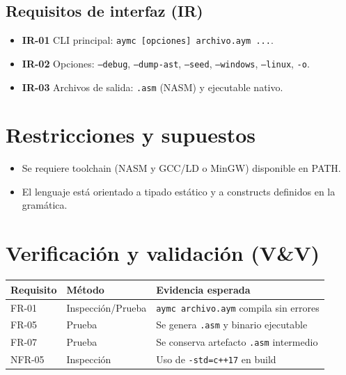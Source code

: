 \documentclass[11pt,a4paper]{article}
\begin{document}
\subsection{Requisitos de interfaz (IR)}
\begin{itemize}
    \item \textbf{IR-01} CLI principal: \texttt{aymc [opciones] archivo.aym ...}.
    \item \textbf{IR-02} Opciones: \texttt{--debug}, \texttt{--dump-ast}, \texttt{--seed}, \texttt{--windows}, \texttt{--linux}, \texttt{-o}.
    \item \textbf{IR-03} Archivos de salida: \texttt{.asm} (NASM) y ejecutable nativo.
\end{itemize}

\section{Restricciones y supuestos}
\begin{itemize}
    \item Se requiere toolchain (NASM y GCC/LD o MinGW) disponible en PATH.
    \item El lenguaje está orientado a tipado estático y a constructs definidos en la gramática.
\end{itemize}

\section{Verificación y validación (V\&V)}
\begin{longtable}{@{}p{3cm}p{3cm}p{8cm}@{}}
\toprule
\textbf{Requisito} & \textbf{Método} & \textbf{Evidencia esperada} \\ \midrule
FR-01 & Inspección/Prueba & \texttt{aymc archivo.aym} compila sin errores \\
FR-05 & Prueba & Se genera \texttt{.asm} y binario ejecutable \\
FR-07 & Prueba & Se conserva artefacto \texttt{.asm} intermedio \\
NFR-05 & Inspección & Uso de \texttt{-std=c++17} en build \\ \bottomrule
\end{longtable}
\end{document}
